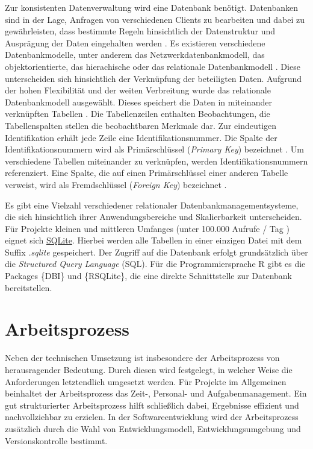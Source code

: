 \documentclass[
]{article}
\begin{document}
Zur konsistenten Datenverwaltung wird eine Datenbank benötigt. Datenbanken sind in der Lage, Anfragen von verschiedenen Clients zu bearbeiten und dabei zu gewährleisten, dass bestimmte Regeln hinsichtlich der Datenstruktur und Ausprägung der Daten eingehalten werden \autocite[S.68ff]{Bühler2018}. Es existieren verschiedene Datenbankmodelle, unter anderem das Netzwerkdatenbankmodell, das objektorientierte, das hierachische oder das relationale Datenbankmodell \autocite{laudon2015}. Diese unterscheiden sich hinsichtlich der Verknüpfung der beteiligten Daten. Aufgrund der hohen Flexibilität und der weiten Verbreitung wurde das relationale Datenbankmodell ausgewählt. Dieses speichert die Daten in miteinander verknüpften Tabellen \autocite[S.69-76]{Bühler2018}. Die Tabellenzeilen enthalten Beobachtungen, die Tabellenspalten stellen die beobachtbaren Merkmale dar. Zur eindeutigen Identifikation erhält jede Zeile eine Identifikationsnummer. Die Spalte der Identifikationsnummern wird als Primärschlüssel (\emph{Primary Key}) bezeichnet \autocite[S.73]{Bühler2018}. Um verschiedene Tabellen miteinander zu verknüpfen, werden Identifikationsnummern referenziert. Eine Spalte, die auf einen Primärschlüssel einer anderen Tabelle verweist, wird als Fremdschlüssel (\emph{Foreign Key}) bezeichnet \autocite[S.70]{Bühler2018}.

Es gibt eine Vielzahl verschiedener relationaler Datenbankmanagementsysteme, die sich hinsichtlich ihrer Anwendungsbereiche und Skalierbarkeit unterscheiden. Für Projekte kleinen und mittleren Umfanges (unter 100.000 Aufrufe / Tag \autocite{whysqlite}) eignet sich \href{https://www.sqlite.org/index.html}{SQLite}. Hierbei werden alle Tabellen in einer einzigen Datei mit dem Suffix \emph{.sqlite} gespeichert. Der Zugriff auf die Datenbank erfolgt grundsätzlich über die \emph{Structured Query Language} (SQL). Für die Programmiersprache R gibt es die Packages \{DBI\} und \{RSQLite\}, die eine direkte Schnittstelle zur Datenbank bereitstellen.

\hypertarget{workflow}{%
\section{Arbeitsprozess}\label{workflow}}

Neben der technischen Umsetzung ist insbesondere der Arbeitsprozess von herausragender Bedeutung. Durch diesen wird festgelegt, in welcher Weise die Anforderungen letztendlich umgesetzt werden. Für Projekte im Allgemeinen beinhaltet der Arbeitsprozess das Zeit-, Personal- und Aufgabenmanagement. Ein gut strukturierter Arbeitsprozess hilft schließlich dabei, Ergebnisse effizient und nachvollziehbar zu erzielen. In der Softwareentwicklung wird der Arbeitsprozess zusätzlich durch die Wahl von Entwicklungsmodell, Entwicklungsumgebung und Versionskontrolle bestimmt.
\end{document}
